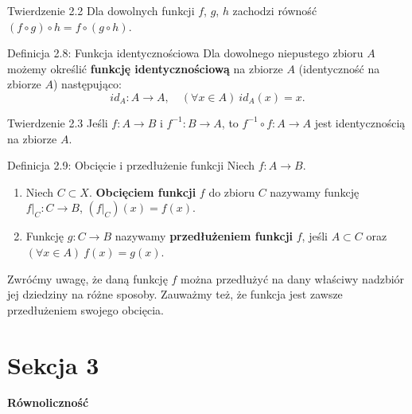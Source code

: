 \documentclass{article}
\begin{document}
\begin{twier}{Twierdzenie 2.2}
    Dla dowolnych funkcji $f$, $g$, $h$ zachodzi równość
     $(f\circ g)\circ h= f\circ (g\circ h)$.
\end{twier}

\begin{defr}{Definicja 2.8: Funkcja identycznościowa}
    Dla dowolnego niepustego zbioru $A$ możemy określić \textbf{funkcję identycznościową}
    na zbiorze $A$ (identyczność na zbiorze $A$) następująco:
    \begin{equation*}
        id_A:A\to A,\quad (\forall x\in A)\ id_A(x)=x.
    \end{equation*}
\end{defr}

\begin{twier}{Twierdzenie 2.3}
    Jeśli $f:A\to B$ i $f^{-1}:B\to A$, to $f^{-1}\circ f:A\to A$ jest identycznością na
    zbiorze $A$.
\end{twier}

\begin{defr}{Definicja 2.9: Obcięcie i przedłużenie funkcji}
    Niech $f:A\to B$.
    \begin{enumerate}[label=(\arabic*)]
        \item Niech $C\subset X$. \textbf{Obcięciem funkcji} $f$ do zbioru
        $C$ nazywamy funkcję $f|_C:C\to B$,  $(f|_C)(x)=f(x)$.
        \item Funkcję $g:C\to B$ nazywamy \textbf{przedłużeniem funkcji}
        $f$, jeśli $A\subset C$ oraz $(\forall x\in A)\ f(x)=g(x)$.
    \end{enumerate}
\end{defr}

Zwróćmy uwagę, że daną funkcję $f$ można przedłużyć na dany właściwy nadzbiór
jej dziedziny na różne sposoby. Zauważmy też, że funkcja jest zawsze przedłużeniem
swojego obcięcia.

\newpage


                                \section*{Sekcja 3}\smallskip
                                {\Huge\bfseries Równoliczność} \bigskip \medskip
\end{document}
